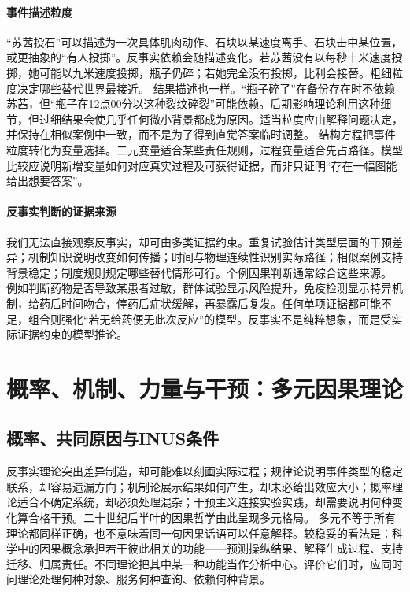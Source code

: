 \paragraph{事件描述粒度}

“苏茜投石”可以描述为一次具体肌肉动作、石块以某速度离手、石块击中某位置，或更抽象的“有人投掷”。反事实依赖会随描述变化。若苏茜没有以每秒十米速度投掷，她可能以九米速度投掷，瓶子仍碎；若她完全没有投掷，比利会接替。粗细粒度决定哪些替代世界最接近。
结果描述也一样。“瓶子碎了”在备份存在时不依赖苏茜，但“瓶子在12点00分以这种裂纹碎裂”可能依赖。后期影响理论利用这种细节，但过细结果会使几乎任何微小背景都成为原因。适当粒度应由解释问题决定，并保持在相似案例中一致，而不是为了得到直觉答案临时调整。
结构方程把事件粒度转化为变量选择。二元变量适合某些责任规则，过程变量适合先占路径。模型比较应说明新增变量如何对应真实过程及可获得证据，而非只证明“存在一幅图能给出想要答案”。

\paragraph{反事实判断的证据来源}

我们无法直接观察反事实，却可由多类证据约束。重复试验估计类型层面的干预差异；机制知识说明改变如何传播；时间与物理连续性识别实际路径；相似案例支持背景稳定；制度规则规定哪些替代情形可行。个例因果判断通常综合这些来源。
例如判断药物是否导致某患者过敏，群体试验显示风险提升，免疫检测显示特异机制，给药后时间吻合，停药后症状缓解，再暴露后复发。任何单项证据都可能不足，组合则强化“若无给药便无此次反应”的模型。反事实不是纯粹想象，而是受实际证据约束的模型推论。

\section{概率、机制、力量与干预：多元因果理论}

\subsection{概率、共同原因与INUS条件}

反事实理论突出差异制造，却可能难以刻画实际过程；规律论说明事件类型的稳定联系，却容易遗漏方向；机制论展示结果如何产生，却未必给出效应大小；概率理论适合不确定系统，却必须处理混杂；干预主义连接实验实践，却需要说明何种变化算合格干预。二十世纪后半叶的因果哲学由此呈现多元格局。
多元不等于所有理论都同样正确，也不意味着同一句因果话语可以任意解释。较稳妥的看法是：科学中的因果概念承担若干彼此相关的功能------预测操纵结果、解释生成过程、支持迁移、归属责任。不同理论把其中某一种功能当作分析中心。评价它们时，应同时问理论处理何种对象、服务何种查询、依赖何种背景。

